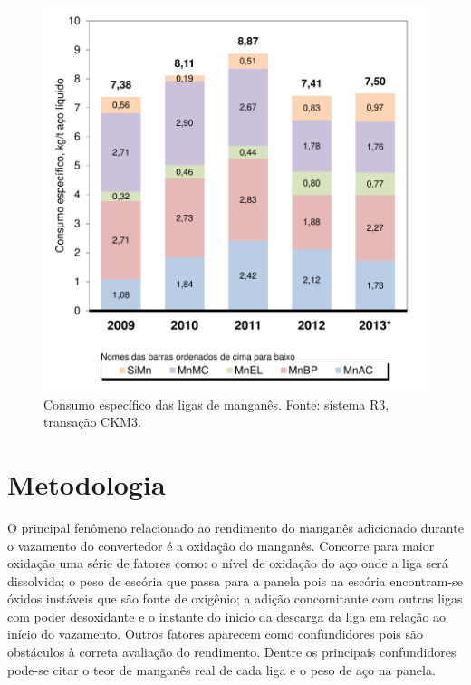		\begin{figure}[H]
			\centering
			\includegraphics[scale=0.55, bb=0 0 432 432, trim=0in 0in 0in 0in]{figures/fig04-excel.pdf} %
			\caption{Consumo específico das ligas de manganês. Fonte: sistema R3, transação CKM3.}
			\label{fig:evol_kgt}
		\end{figure}		
\section{Metodologia}	
	O principal fenômeno relacionado ao rendimento do manganês adicionado durante o vazamento do convertedor é a oxidação do manganês. Concorre para maior oxidação uma série de fatores como: o nível de oxidação do aço onde a liga será dissolvida; o peso de escória que passa para a panela pois na escória encontram-se óxidos instáveis que são fonte de oxigênio; a adição concomitante com  outras ligas com poder desoxidante e o instante do inicio da descarga da liga em relação ao início do vazamento. Outros fatores aparecem como confundidores pois são obstáculos à correta avaliação do rendimento. Dentre os principais confundidores pode-se citar o teor de manganês real de cada liga e o peso de aço na panela.
	
